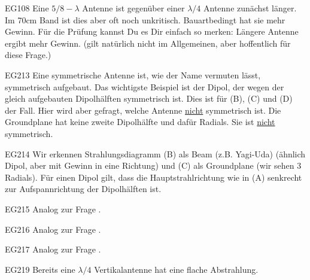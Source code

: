 \begin{sol}{EG108}
Eine $5/8-\lambda$ Antenne ist gegenüber einer $\lambda / 4$ Antenne zunächst länger. Im 70cm Band ist dies aber oft noch unkritisch.
Bauartbedingt hat sie mehr Gewinn. Für die Prüfung kannst Du es Dir einfach so merken: Längere Antenne ergibt mehr Gewinn. (gilt natürlich nicht im Allgemeinen, aber hoffentlich für diese Frage.)
\end{sol}


\begin{sol}{EG213}
Eine symmetrische Antenne ist, wie der Name vermuten lässt, symmetrisch aufgebaut. Das wichtigste Beispiel ist der Dipol, der wegen der gleich aufgebauten Dipolhälften symmetrisch ist.
Dies ist für (B), (C) und (D) der Fall. Hier wird aber gefragt, welche Antenne \underline{nicht} symmetrisch ist. Die Groundplane hat keine zweite Dipolhälfte und dafür Radials. Sie ist \underline{nicht} symmetrisch.
\end{sol}


\begin{sol}{EG214} 
    Wir erkennen Strahlungsdiagramm (B) als Beam (z.B. Yagi-Uda) (ähnlich Dipol, aber mit Gewinn in eine Richtung) und (C) als Groundplane (wir sehen 3 Radials). 
    Für einen Dipol gilt, dass die Hauptstrahlrichtung wie in (A) senkrecht zur Aufspannrichtung der Dipolhälften ist.    
\end{sol}


\begin{sol}{EG215} 
    Analog zur Frage .
\end{sol}

\begin{sol}{EG216} 
    Analog zur Frage .
\end{sol}


\begin{sol}{EG217} 
    Analog zur Frage .
\end{sol}

\begin{sol}{EG219} 
    Bereits eine $\lambda /4$ Vertikalantenne hat eine flache Abstrahlung. 
\end{sol}


